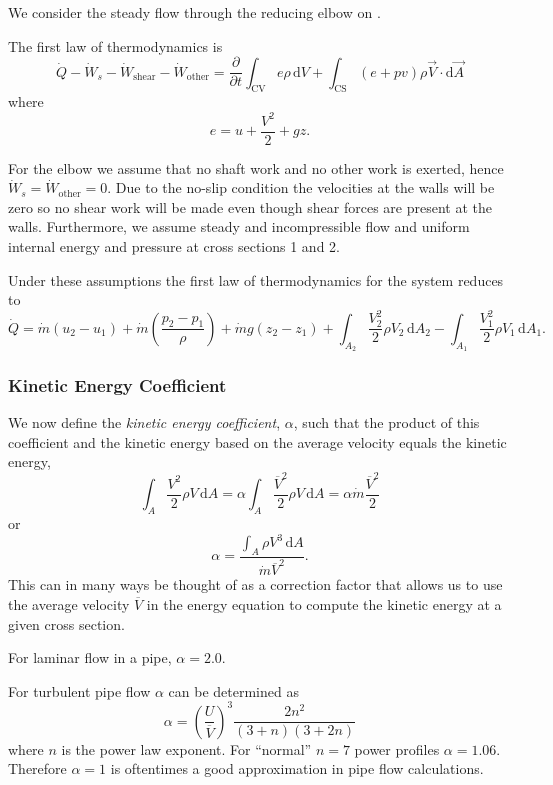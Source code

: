 We consider the steady flow through the reducing elbow on . 

The first law of thermodynamics is
\[ 
\dot{Q} - \dot{W}_s - \dot{W}_{\mathrm{shear}} -  \dot{W}_{\mathrm{other}} = \frac{\partial }{\partial t}  \int_{\mathrm{CV}} e \rho \, \mathrm{d}V + \int_{\mathrm{CS}} \left( e + p v \right)\rho \Vec{V} \cdot \mathrm{d}\Vec{A}
\]
where
\[ 
e = u + \frac{V^2}{2} + gz
.\]

For the elbow we assume that no shaft work and no other work is exerted, hence $\dot{W}_s = \dot{W}_{\mathrm{other}} = 0$.
Due to the no-slip condition the velocities at the walls will be zero so no shear work will be made even though shear forces are present at the walls.
Furthermore, we assume steady and incompressible flow and uniform internal energy and pressure at cross sections 1 and 2.

Under these assumptions the first law of thermodynamics for the system reduces to
\[ 
\dot{Q} = \dot{m} \left( u_2 - u_1 \right) + \dot{m} \left( \frac{p_2 - p_1}{\rho} \right) + \dot{m} g \left( z_2 - z_1 \right) + \int_{A_2} \frac{V_2^2}{2} \rho V_2 \, \mathrm{d}A_2 - \int_{A_1} \frac{V_1^2}{2}\rho V_1 \, \mathrm{d}A_1
.\]

\subsubsection{Kinetic Energy Coefficient}
We now define the \textit{kinetic energy coefficient}, $\alpha$, such that the product of this coefficient and the kinetic energy based on the average velocity equals the kinetic energy,
\[ 
\int_A \frac{V^2}{2} \rho V \, \mathrm{d}A = \alpha \int_A \frac{\overline{V}^2}{2} \rho V \, \mathrm{d}A = \alpha \dot{m} \frac{\overline{V}^2}{2}
\]
or
\[ 
\alpha = \frac{\int_A \rho V^3 \, \mathrm{d}A}{\dot{m} \overline{V}^2}
.\]
This can in many ways be thought of as a correction factor that allows us to use the average velocity $\overline{V}$ in the energy equation to compute the kinetic energy at a given cross section.

For laminar flow in a pipe, $\alpha = \num{2,0}$.

For turbulent pipe flow $\alpha$ can be determined as
\[ 
\alpha = \left( \frac{U}{\overline{V}} \right)^3 \frac{2n^2}{\left( 3+n \right)(3+2n)}
\]
where $n$ is the power law exponent.
For ``normal'' $n = 7$ power profiles $\alpha = \num{1,06}$.
Therefore $\alpha = 1$ is oftentimes a good approximation in pipe flow calculations.

